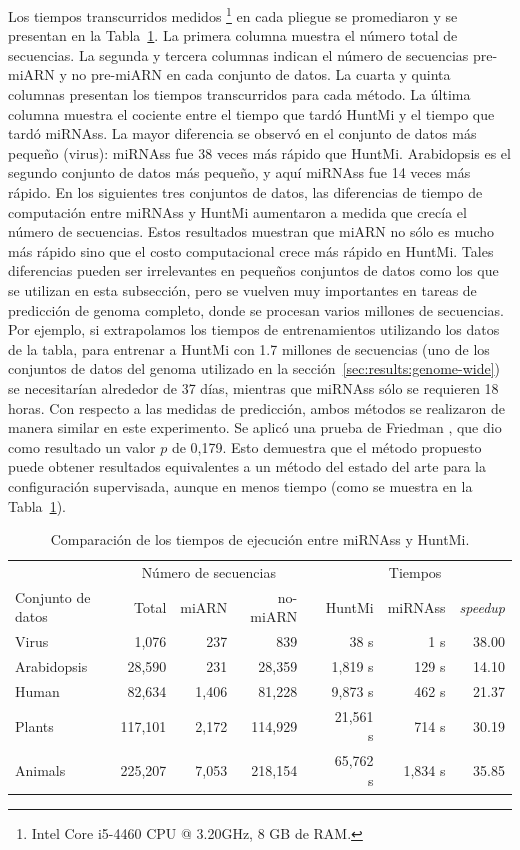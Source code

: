 Los tiempos transcurridos medidos \footnote{Intel \textregistered Core \texttrademark i5-4460 CPU @ 3.20GHz, 8 GB de RAM.} en cada pliegue se promediaron y se
presentan en la Tabla~\ref{tab:times}. La primera columna muestra el número total de secuencias. La segunda y tercera columnas indican el número de
secuencias pre-miARN y no pre-miARN en cada conjunto de datos. La cuarta y quinta columnas presentan los tiempos transcurridos para cada método. La última
columna muestra el cociente entre el tiempo que tardó HuntMi y el tiempo que tardó miRNAss. La mayor diferencia se observó en el conjunto de datos más
pequeño (virus): miRNAss fue 38 veces más rápido que HuntMi. Arabidopsis es el segundo conjunto de datos más pequeño, y aquí miRNAss fue 14 veces más
rápido. En los siguientes tres conjuntos de datos, las diferencias de tiempo de computación entre miRNAss y HuntMi aumentaron a medida que crecía el número
de secuencias. Estos resultados muestran que miARN no sólo es mucho más rápido sino que el costo computacional crece más rápido en HuntMi. Tales
diferencias pueden ser irrelevantes en pequeños conjuntos de datos como los que se utilizan en esta subsección, pero se vuelven muy importantes en tareas de
predicción de genoma completo, donde se procesan varios millones de secuencias. Por ejemplo, si extrapolamos los tiempos de entrenamientos utilizando los
datos de la tabla, para entrenar a HuntMi con 1.7 millones de secuencias (uno de los conjuntos de datos del genoma utilizado en la sección~\ref{sec:results:genome-wide})
se necesitarían alrededor de 37 días, mientras que miRNAss sólo se requieren 18 horas.
Con respecto a las medidas de predicción, ambos métodos se realizaron de manera similar en este experimento. Se aplicó una prueba de Friedman \citep{friedman1937use},
que dio como resultado un valor $ p $ de 0,179. Esto demuestra que el método propuesto puede obtener resultados equivalentes a un método
del estado del arte para la configuración supervisada, aunque en menos tiempo (como se muestra en la Tabla~\ref{tab:times}).
\begin{table}[t]
	\small
	\centering
	\begin{tabular}{@{}lrrrrrrr@{}} \toprule
		&  \multicolumn{3}{c}{Número de secuencias} & & \multicolumn{3}{c}{Tiempos} \\ \cmidrule{2-4} \cmidrule{6-8}
		Conjunto de datos     &   Total  &   miARN   &  no-miARN& &  HuntMi  & miRNAss & \textit{speedup} \\\midrule
		Virus       &   1,076  &      237  &       839 & &     38 s &     1 s & 38.00    \\
		Arabidopsis &  28,590  &      231  &    28,359 & &  1,819 s &   129 s & 14.10    \\
		Human       &  82,634  &    1,406  &    81,228 & &  9,873 s &   462 s & 21.37    \\
		Plants      & 117,101  &    2,172  &   114,929 & & 21,561 s &   714 s & 30.19    \\
		Animals     & 225,207  &    7,053  &   218,154 & & 65,762 s & 1,834 s & 35.85    \\\bottomrule
	\end{tabular}
	\caption[Comparación de tiempos de ejecución]{Comparación de los tiempos de ejecución entre miRNAss y HuntMi.\label{tab:times}}
\end{table}
